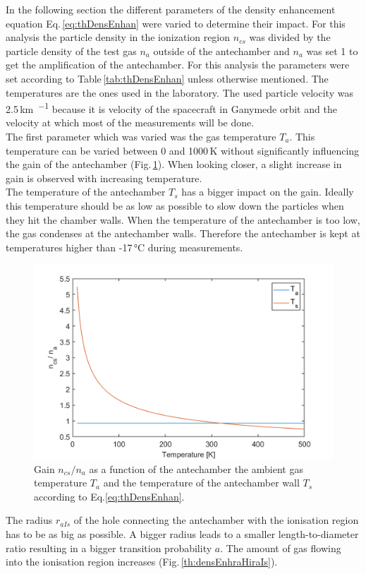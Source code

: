 	In the following section the different parameters of the density enhancement equation Eq.\,\eqref{eq:thDensEnhan} were varied to determine their impact. For this analysis the particle density in the ionization region $n_{cs}$ was divided by the particle density of the test gas $n_a$ outside of the antechamber and $n_a$ was set 1 to get the amplification of the antechamber. For this analysis the parameters were set according to Table\,\ref{tab:thDensEnhan} unless otherwise mentioned. The temperatures are the ones used in the laboratory. The used particle velocity was 2.5\,\si{\kilo\meter\per\sec} because it is velocity of the spacecraft in Ganymede orbit and the velocity at which most of the measurements will be done.\\		
	The first parameter which was varied was the gas temperature $T_a$. This temperature can be varied between 0 and 1000\,\si{\kelvin} without significantly influencing the gain of the antechamber (Fig.\,\ref{th:densEnhTaTs}). When looking closer, a slight increase in gain is observed with increasing temperature.\\
	The temperature of the antechamber $T_s$ has a bigger impact on the gain. Ideally this temperature should be as low as possible to slow down the particles when they hit the chamber walls. When the temperature of the antechamber is too low, the gas condenses at the antechamber walls. Therefore the antechamber is kept at temperatures higher than -17\,\si{\degreeCelsius} during measurements.
	\begin{figure}[h!] %
		\centering
		\includegraphics[width= .7\textwidth]{Bilder/Ta_Ts.png}
		\caption{Gain $n_{cs}/n_a$ as a function of the antechamber the ambient gas temperature $T_a$ and the temperature of the antechamber wall $T_s$ according to Eq.\eqref{eq:thDensEnhan}.}
		\label{th:densEnhTaTs}
	\end{figure}
	The radius $r_{aIs}$ of the hole connecting the antechamber with the ionisation region has to be as big as possible. A bigger radius leads to a smaller length-to-diameter ratio resulting in a bigger transition probability $a$. The amount of gas flowing into the ionisation region increases (Fig.\,\ref{th:densEnhraHiraIs}).\\
